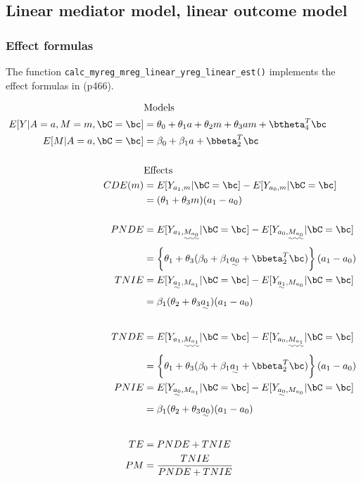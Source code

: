 \documentclass[10pt]{article}
\begin{document}
\subsection{Linear mediator model, linear outcome model}
\label{sec:org00175f4}
\subsubsection{Effect formulas}
\label{sec:org5d539f8}
The function \texttt{calc\_myreg\_mreg\_linear\_yreg\_linear\_est()} implements the effect formulas in \cite{vanderweeleExplanationCausalInference2015} (p466).

\begin{align*}
  &\text{Models}\\
  E[Y|A=a,M=m,\bC=\bc] &= \theta_{0} + \theta_{1}a + \theta_{2}m + \theta_{3}am + \btheta_{4}^{T}\bc\\
  E[M|A=a,\bC=\bc] &= \beta_{0} + \beta_{1}a + \bbeta_{2}^{T}\bc\\
  \\
  &\text{Effects}\\
  CDE(m) &= E[Y_{a_{1},m} | \bC = \bc] - E[Y_{a_{0},m} | \bC = \bc]\\
  &= (\theta_{1} + \theta_{3}m)(a_{1} - a_{0})\\
  \\
  PNDE &= E[Y_{a_{1},\uwave{M_{a_{0}}}} | \bC = \bc] - E[Y_{a_{0},\uwave{M_{a_{0}}}} | \bC = \bc]\\
  &= \left\{ \theta_{1} + \theta_{3}(\beta_{0} + \beta_{1}\uwave{a_{0}} + \bbeta_{2}^{T}\bc) \right\} (a_{1} - a_{0})\\
  TNIE &= E[Y_{\uwave{a_{1}},M_{a_{1}}} | \bC = \bc] - E[Y_{\uwave{a_{1}},M_{a_{0}}} | \bC = \bc]\\
  &= \beta_{1}(\theta_{2} + \theta_{3}\uwave{a_{1}})(a_{1} - a_{0})\\
  \\
  TNDE &= E[Y_{a_{1},\uwave{M_{a_{1}}}} | \bC = \bc] - E[Y_{a_{0},\uwave{M_{a_{1}}}} | \bC = \bc]\\
  &= \left\{ \theta_{1} + \theta_{3}(\beta_{0} + \beta_{1}\uwave{a_{1}} + \bbeta_{2}^{T}\bc) \right\} (a_{1} - a_{0})\\
  PNIE &= E[Y_{\uwave{a_{0}},M_{a_{1}}} | \bC = \bc] - E[Y_{\uwave{a_{0}},M_{a_{0}}} | \bC = \bc]\\
  &= \beta_{1}(\theta_{2} + \theta_{3}\uwave{a_{0}})(a_{1} - a_{0})\\
  \\
  TE &= PNDE + TNIE\\
  PM &= \frac{TNIE}{PNDE + TNIE}\\
\end{align*}
\end{document}
